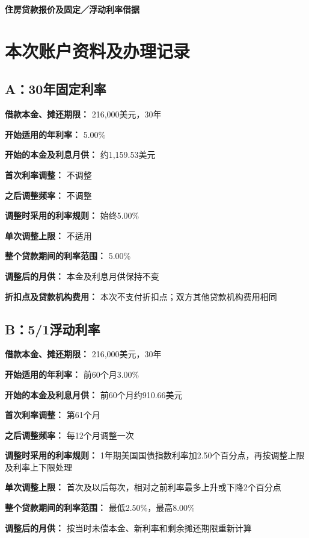 \documentclass[UTF8,fontset=none,11pt,a4paper]{ctexart}
\begin{document}
{\noindent\LARGE\bfseries 住房贷款报价及固定／浮动利率借据\par}
\vspace{10pt}
\section*{本次账户资料及办理记录}
\subsection*{A：30年固定利率}
\textbf{借款本金、摊还期限：} 216,000美元，30年


\textbf{开始适用的年利率：} 5.00\%


\textbf{开始的本金及利息月供：} 约1,159.53美元


\textbf{首次利率调整：} 不调整


\textbf{之后调整频率：} 不调整


\textbf{调整时采用的利率规则：} 始终5.00\%


\textbf{单次调整上限：} 不适用


\textbf{整个贷款期间的利率范围：} 5.00\%


\textbf{调整后的月供：} 本金及利息月供保持不变


\textbf{折扣点及贷款机构费用：} 本次不支付折扣点；双方其他贷款机构费用相同


\subsection*{B：5/1浮动利率}
\textbf{借款本金、摊还期限：} 216,000美元，30年


\textbf{开始适用的年利率：} 前60个月3.00\%


\textbf{开始的本金及利息月供：} 前60个月约910.66美元


\textbf{首次利率调整：} 第61个月


\textbf{之后调整频率：} 每12个月调整一次


\textbf{调整时采用的利率规则：} 1年期美国国债指数利率加2.50个百分点，再按调整上限及利率上下限处理


\textbf{单次调整上限：} 首次及以后每次，相对之前利率最多上升或下降2个百分点


\textbf{整个贷款期间的利率范围：} 最低2.50\%，最高8.00\%


\textbf{调整后的月供：} 按当时未偿本金、新利率和剩余摊还期限重新计算
\end{document}
